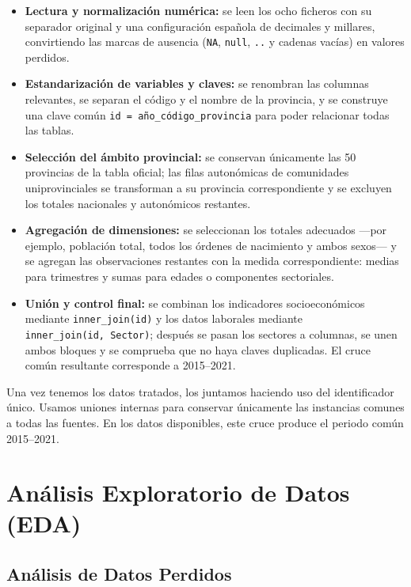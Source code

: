 \documentclass[,article,submit,moreauthors,pdftex]{Definitions/mdpi}
\begin{document}
\begin{itemize}
\item
  \textbf{Lectura y normalización numérica:} se leen los ocho ficheros
  con su separador original y una configuración española de decimales y
  millares, convirtiendo las marcas de ausencia (\texttt{NA},
  \texttt{null}, \texttt{..} y cadenas vacías) en valores perdidos.
\item
  \textbf{Estandarización de variables y claves:} se renombran las
  columnas relevantes, se separan el código y el nombre de la provincia,
  y se construye una clave común \texttt{id\ =\ año\_código\_provincia}
  para poder relacionar todas las tablas.
\item
  \textbf{Selección del ámbito provincial:} se conservan únicamente las
  50 provincias de la tabla oficial; las filas autonómicas de
  comunidades uniprovinciales se transforman a su provincia
  correspondiente y se excluyen los totales nacionales y autonómicos
  restantes.
\item
  \textbf{Agregación de dimensiones:} se seleccionan los totales
  adecuados ---por ejemplo, población total, todos los órdenes de
  nacimiento y ambos sexos--- y se agregan las observaciones restantes
  con la medida correspondiente: medias para trimestres y sumas para
  edades o componentes sectoriales.
\item
  \textbf{Unión y control final:} se combinan los indicadores
  socioeconómicos mediante \texttt{inner\_join(id)} y los datos
  laborales mediante \texttt{inner\_join(id,\ Sector)}; después se pasan
  los sectores a columnas, se unen ambos bloques y se comprueba que no
  haya claves duplicadas. El cruce común resultante corresponde a
  2015--2021.
\end{itemize}

Una vez tenemos los datos tratados, los juntamos haciendo uso del
identificador único. Usamos uniones internas para conservar únicamente
las instancias comunes a todas las fuentes. En los datos disponibles,
este cruce produce el periodo común 2015--2021.

\section{Análisis Exploratorio de Datos
(EDA)}\label{anuxe1lisis-exploratorio-de-datos-eda}

\subsection{Análisis de Datos
Perdidos}\label{anuxe1lisis-de-datos-perdidos}
\end{document}
